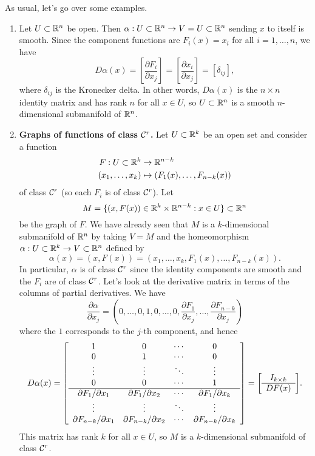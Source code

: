As usual, let's go over some examples. 
\begin{enumerate}[(1)]
    \item Let $U \subset \mathbb{R}^n$ be open. Then $\alpha : U \subset \mathbb{R}^n \to 
    V = U \subset \mathbb{R}^n$ sending $x$ to itself is smooth. Since the 
    component functions are $F_i(x) = x_i$ for all $i = 1, \dots, n$, we have 
    \[ D\alpha(x) = \left[ \frac{\partial F_i}{\partial x_j} \right] 
    = \left[ \frac{\partial x_i}{\partial x_j} \right] = [\delta_{ij}], \] 
    where $\delta_{ij}$ is the Kronecker delta. In other words, $D\alpha(x)$ 
    is the $n \times n$ identity matrix and has rank $n$ for all $x \in U$, 
    so $U \subset \mathbb{R}^n$ is a smooth $n$-dimensional submanifold of $\mathbb{R}^n$. 

    \item {\bf Graphs of functions of class ${\cal C}^r$.} Let $U \subset \mathbb{R}^k$ 
    be an open set and consider a function 
    \begin{align*}
        F : U \subset \mathbb{R}^k &\to \mathbb{R}^{n-k} \\ 
        (x_1, \dots, x_k) &\mapsto (F_1(x), \dots, F_{n-k}(x)) 
    \end{align*} 
    of class ${\cal C}^r$ (so each $F_i$ is of class ${\cal C}^r$). Let 
    \[ M = \{(x, F(x)) \in \mathbb{R}^k \times \mathbb{R}^{n-k} : x \in U\} \subset \mathbb{R}^n \] 
    be the graph of $F$. We have already seen that $M$ is a $k$-dimensional 
    submanifold of $\mathbb{R}^n$ by taking $V = M$ and the homeomorphism 
    $\alpha : U \subset \mathbb{R}^k \to V \subset \mathbb{R}^n$ defined by 
    \[ \alpha(x) = (x, F(x)) = (x_1, \dots, x_k, F_1(x), \dots, F_{n-k}(x)). \]
    In particular, $\alpha$ is of class ${\cal C}^r$ since the identity components 
    are smooth and the $F_i$ are of class ${\cal C}^r$. Let's look at the 
    derivative matrix in terms of the columns of partial derivatives. We have 
    \[ \frac{\partial\alpha}{\partial x_j} = 
    \left( 0, \dots, 0, 1, 0, \dots, 0, \frac{\partial F_1}{\partial x_j}, 
    \dots, \frac{\partial F_{n-k}}{\partial x_j} \right) \] 
    where the $1$ corresponds to the $j$-th component, and hence 
    \[ D\alpha(x) = \mleft[ \begin{array}{cccc}
        1 & 0 & \cdots & 0 \\ 
        0 & 1 & \cdots & 0 \\ 
        \vdots & \vdots & \ddots & \vdots \\ 
        0 & 0 & \cdots & 1 \\ \hline 
        \partial F_1/\partial x_1 & \partial F_1/\partial x_2 & \cdots & \partial F_1/\partial x_k \\ 
        \vdots & \vdots & \ddots & \vdots \\ 
        \partial F_{n-k}/\partial x_1 & \partial F_{n-k}/\partial x_2 & \cdots & \partial F_{n-k}/\partial x_k \\
    \end{array} \mright] = \mleft[ \begin{array}{c} I_{k\times k} \\\hline DF(x) \end{array} \mright]. \]
    This matrix has rank $k$ for all $x \in U$, so $M$ is a $k$-dimensional 
    submanifold of class ${\cal C}^r$. 


\end{enumerate}
